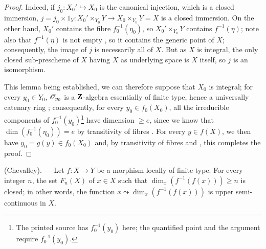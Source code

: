 \begin{proof}
Indeed, if $j_0:X_0'\hookrightarrow X_0$ is the canonical injection, which is a closed immersion, $j=j_0\times 1_Y:X_0'\times_{Y_0}Y\to X_0\times_{Y_0}Y=X$ is a closed immersion.
On the other hand, $X_0'$ contains the fibre $f_0^{-1}(\eta_0)$, so $X_0'\times_{Y_0}Y$ contains $f^{-1}(\eta)$; note also that $f^{-1}(\eta)$ is not empty , so it contains the generic point of $X$; consequently, the image of $j$ is necessarily all of $X$.
But as $X$ is integral, the only closed sub-prescheme of $X$ having $X$ as underlying space is $X$ itself, so $j$ is an isomorphism.

This lemma being established, we can therefore suppose that $X_0$ is integral; for every $y_0\in Y_0$, $\mathscr{O}_{y_0}$ is a $\mathbf{Z}$-algebra essentially of finite type, hence a universally
catenary ring ; consequently, for every $y_0\in f_0(X_0)$, all the irreducible components of $f_0^{-1}(y_0)$\footnote{The printed source has $f_0^{-1}(y_0)$ here; the quantified point and the argument require $f_0^{-1}(y_0)$.} have dimension $\geq e$, since we know that $\dim(f_0^{-1}(\eta_0))=e$ by transitivity of fibres .
For every $y\in f(X)$, we then have $y_0=g(y)\in f_0(X_0)$ and, by transitivity of fibres and , this completes the proof.
\end{proof}

\begin{theorem}[13.1.3]
\label{IV.13.1.3}
\textnormal{(Chevalley).} ---
Let $f:X\to Y$ be a morphism locally of finite type.
For every integer $n$, the set $F_n(X)$ of $x\in X$ such that $\dim_x(f^{-1}(f(x)))\geq n$ is closed; in other words, the function $x\leadsto\dim_x(f^{-1}(f(x)))$ is upper semi-continuous in $X$.
\end{theorem}

